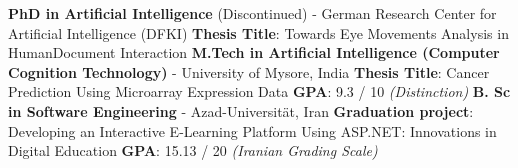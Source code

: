 %
%
%

\vspace{1em}

\begin{scholarship}
{
	\textbf{PhD in Artificial Intelligence} (Discontinued) - German Research Center for Artificial Intelligence (DFKI)\newline
	\textbf{Thesis Title}: Towards Eye Movements Analysis in Human\-Document Interaction \newline
}
	{
		\textbf{M.Tech in Artificial Intelligence (Computer Cognition Technology)} - University of Mysore, India \newline
		\textbf{Thesis Title}: Cancer Prediction Using Microarray Expression Data \newline
		\textbf{GPA}: 9.3 / 10 \textit{(Distinction)
		 }\newline
	}
	{
		\textbf{B. Sc in Software Engineering} - Azad-Universität, Iran \newline
		\textbf{Graduation project}: Developing an Interactive E-Learning Platform Using ASP.NET: Innovations in Digital Education \newline
		\textbf{GPA}: 15.13 / 20 \textit{(Iranian Grading Scale)}  \newline
	}
\end{scholarship}
